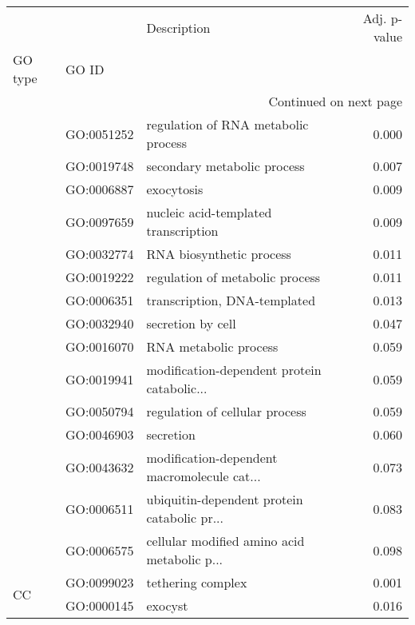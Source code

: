 \begin{longtable}{lllr}
\toprule
   &            &                                  Description &  Adj. p-value \\
GO type & GO ID &                                              &               \\
\midrule
\endhead
\midrule
\multicolumn{4}{r}{{Continued on next page}} \\
\midrule
\endfoot

\bottomrule
\endlastfoot
\multirow{15}{*}{BP} & GO:0051252 &          regulation of RNA metabolic process &         0.000 \\
   & GO:0019748 &                  secondary metabolic process &         0.007 \\
   & GO:0006887 &                                   exocytosis &         0.009 \\
   & GO:0097659 &         nucleic acid-templated transcription &         0.009 \\
   & GO:0032774 &                     RNA biosynthetic process &         0.011 \\
   & GO:0019222 &              regulation of metabolic process &         0.011 \\
   & GO:0006351 &                 transcription, DNA-templated &         0.013 \\
   & GO:0032940 &                            secretion by cell &         0.047 \\
   & GO:0016070 &                        RNA metabolic process &         0.059 \\
   & GO:0019941 &  modification-dependent protein catabolic... &         0.059 \\
   & GO:0050794 &               regulation of cellular process &         0.059 \\
   & GO:0046903 &                                    secretion &         0.060 \\
   & GO:0043632 &  modification-dependent macromolecule cat... &         0.073 \\
   & GO:0006511 &  ubiquitin-dependent protein catabolic pr... &         0.083 \\
   & GO:0006575 &  cellular modified amino acid metabolic p... &         0.098 \\
\cline{1-4}
\multirow{5}{*}{CC} & GO:0099023 &                            tethering complex &         0.001 \\
   & GO:0000145 &                                      exocyst &         0.016 \\

\end{longtable}
